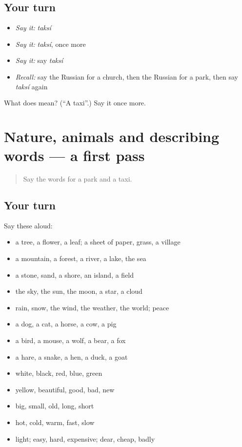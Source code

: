\subsection*{Your turn}
\begin{itemize}
\raggedright
  \item \emph{Say it:} \emph{taksí}
  \item \emph{Say it:} \emph{taksí}, once more
  \item \emph{Say it:} say \emph{taksí}
  \item \emph{Recall:} say the Russian for a church, then the Russian for a park, then say \emph{taksí} again
\end{itemize}

\begin{tcolorbox}[breakable,colback=teal!4,colframe=teal!35!black,title={Before you move on}]
What does  mean? (\textquotedblleft{}A taxi\textquotedblright{}.) Say it once more.
\end{tcolorbox}
\section[(dialogue)]{Nature, animals and describing words — a first pass}

\label{lesson:RU-R80-first-pass-nature-animals-and-describing-words}



\begin{quote}
Say the words for a park and a taxi.
\end{quote}

\subsection*{Your turn}
Say these aloud:

\begin{itemize}
\raggedright
  \item a tree, a flower, a leaf; a sheet of paper, grass, a village
  \item a mountain, a forest, a river, a lake, the sea
  \item a stone, sand, a shore, an island, a field
  \item the sky, the sun, the moon, a star, a cloud
  \item rain, snow, the wind, the weather, the world; peace
  \item a dog, a cat, a horse, a cow, a pig
  \item a bird, a mouse, a wolf, a bear, a fox
  \item a hare, a snake, a hen, a duck, a goat
  \item white, black, red, blue, green
  \item yellow, beautiful, good, bad, new
  \item big, small, old, long, short
  \item hot, cold, warm, fast, slow
  \item light; easy, hard, expensive; dear, cheap, badly
\end{itemize}

